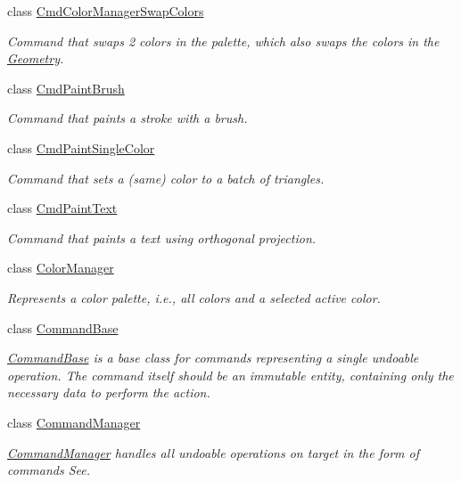 \begin{DoxyCompactItemize}
class \mbox{\hyperlink{classpepr3d_1_1_cmd_color_manager_swap_colors}{Cmd\+Color\+Manager\+Swap\+Colors}}
\begin{DoxyCompactList}\small\item\em Command that swaps 2 colors in the palette, which also swaps the colors in the \mbox{\hyperlink{classpepr3d_1_1_geometry}{Geometry}}. \end{DoxyCompactList}\item 
class \mbox{\hyperlink{classpepr3d_1_1_cmd_paint_brush}{Cmd\+Paint\+Brush}}
\begin{DoxyCompactList}\small\item\em Command that paints a stroke with a brush. \end{DoxyCompactList}\item 
class \mbox{\hyperlink{classpepr3d_1_1_cmd_paint_single_color}{Cmd\+Paint\+Single\+Color}}
\begin{DoxyCompactList}\small\item\em Command that sets a (same) color to a batch of triangles. \end{DoxyCompactList}\item 
class \mbox{\hyperlink{classpepr3d_1_1_cmd_paint_text}{Cmd\+Paint\+Text}}
\begin{DoxyCompactList}\small\item\em Command that paints a text using orthogonal projection. \end{DoxyCompactList}\item 
class \mbox{\hyperlink{classpepr3d_1_1_color_manager}{Color\+Manager}}
\begin{DoxyCompactList}\small\item\em Represents a color palette, i.\+e., all colors and a selected active color. \end{DoxyCompactList}\item 
class \mbox{\hyperlink{classpepr3d_1_1_command_base}{Command\+Base}}
\begin{DoxyCompactList}\small\item\em \mbox{\hyperlink{classpepr3d_1_1_command_base}{Command\+Base}} is a base class for commands representing a single undoable operation. The command itself should be an immutable entity, containing only the necessary data to perform the action. \end{DoxyCompactList}\item 
class \mbox{\hyperlink{classpepr3d_1_1_command_manager}{Command\+Manager}}
\begin{DoxyCompactList}\small\item\em \mbox{\hyperlink{classpepr3d_1_1_command_manager}{Command\+Manager}} handles all undoable operations on target in the form of commands See. \end{DoxyCompactList}\item 

\end{DoxyCompactItemize}
